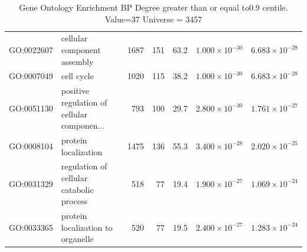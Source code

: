 \begin{table}[ht]
\begin{adjustbox}{max width=\textwidth}
\begin{tabular}{llrrrrr}
  GO:0022607 & cellular component assembly & 1687 & 151 & 63.2 & $1.000 \times 10^{-30}$ & $6.683 \times 10^{-28}$ \\ 
  GO:0007049 & cell cycle & 1020 & 115 & 38.2 & $1.000 \times 10^{-30}$ & $6.683 \times 10^{-28}$ \\ 
  GO:0051130 & positive regulation of cellular componen... & 793 & 100 & 29.7 & $2.800 \times 10^{-30}$ & $1.761 \times 10^{-27}$ \\ 
  GO:0008104 & protein localization & 1475 & 136 & 55.3 & $3.400 \times 10^{-28}$ & $2.020 \times 10^{-25}$ \\ 
  GO:0031329 & regulation of cellular catabolic process & 518 & 77 & 19.4 & $1.900 \times 10^{-27}$ & $1.069 \times 10^{-24}$ \\ 
  GO:0033365 & protein localization to organelle & 520 & 77 & 19.5 & $2.400 \times 10^{-27}$ & $1.283 \times 10^{-24}$ \\ 
   \hline
\end{tabular}
\end{adjustbox}
\caption{Gene Ontology Enrichment BP Degree  greater than or equal to0.9 centile.   Value=37 Universe = 3457} 
\label{tab:Gene Ontology Enrichment BP Degree  greater than or equal to0.9 centile.   Value=37 Universe = 3457}
\end{table}

